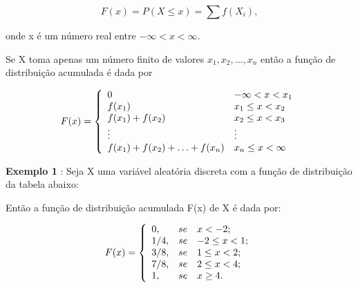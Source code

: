 \begin{equation}\label{}
    F(x)=P(X \leq x)= \sum f(X_{i}),
\end{equation}

onde x é um número real entre $-\infty < x < \infty$.\vskip0.3cm


Se X toma apenas um número finito de valores
$x_{1},x_{2},...,x_{n}$ então a função de distribuição acumulada é
dada por

$$
F(x)=
\left\{%
\begin{array}{ll}
    0                                     & \hbox{$-\infty< x < x_{1}$} \\
    f(x_{1})                              & \hbox{$x_{1} \leq x < x_{2}$} \\
    f(x_{1})+f(x_{2})                     & \hbox{$x_{2} \leq x < x_{3}$} \\
    \vdots                                & \hbox{$\vdots$} \\
    f(x_{1})+f(x_{2})+\ldots+  f(x_{n})   & \hbox{$x_{n} \leq x < \infty$} \\
\end{array}%
\right.
$$


\textbf{Exemplo 1} : Seja X uma variável aleatória discreta com a
função de distribuição da tabela abaixo:


\begin{table}[!htb]
\end{table}


Então a função de distribuição acumulada F(x) de X é dada por:

$$
F(x)=
\left\{%
\begin{array}{ll}
   0   , & se \quad \hbox{$x < -2$;} \\
   1/4 , & se \quad \hbox{$-2 \leq x < 1$;} \\
   3/8 , & se \quad \hbox{$1 \leq x < 2$;} \\
   7/8 , & se \quad \hbox{$2 \leq x < 4$;} \\
   1   , & se \quad \hbox{$x \geq 4$.} \\
\end{array}%
\right.
$$

